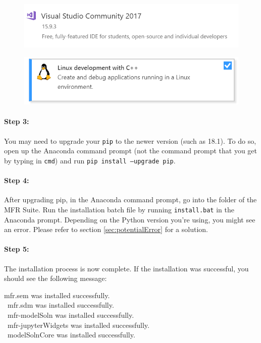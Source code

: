 \documentclass[12pt]{article}
\newcommand{\softwareShortName}{MFR Suite\xspace}
\begin{document}
\begin{figure}[H]
\centering
\begin{minipage}{.5\textwidth}
  \centering
\includegraphics[scale=0.4]{windowsVSInstaller}
  \label{fig:windowsVS}
\end{minipage}%
\begin{minipage}{.5\textwidth}
  \centering
\includegraphics[scale=0.4]{windowsC}
  \label{fig:windowsC}
\end{minipage}
\end{figure}

\paragraph{Step 3:} You may need to upgrade your \texttt{pip} to the newer version (such as 18.1). To do so, open up the Anaconda command prompt (not the command prompt that you get by typing in \texttt{cmd}) and run \texttt{pip install --upgrade pip}.

\paragraph{Step 4:} After upgrading pip, in the Anaconda command prompt, go into the folder of the \softwareShortName. Run the installation batch file by running \texttt{install.bat} in the Anaconda prompt. Depending on the Python version you're using, you might see an error. Please refer to section \ref{sec:potentialError} for a solution.

\paragraph{Step 5:} The installation process is now complete. If the installation was successful, you should see the following message:\\
 \begin{tcolorbox}[colback=green!5!white,colframe=green!75!black]
 mfr.sem was installed successfully.\\\
  mfr.sdm was installed successfully.\\\
  mfr-modelSoln was installed successfully.\\\
  mfr-jupyterWidgets was installed successfully.\\\
  modelSolnCore was installed successfully.
  \end{tcolorbox}
\end{document}
